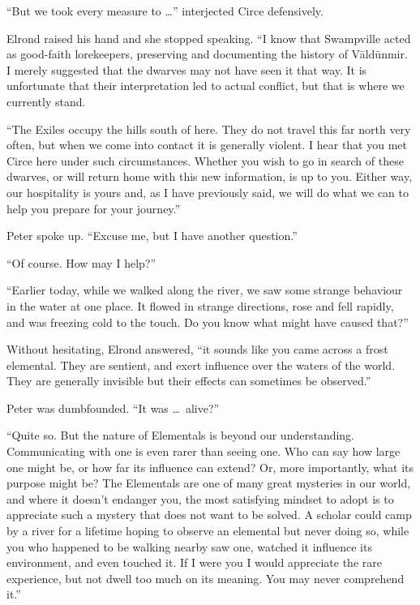 ``But we took every measure to \ldots'' interjected Circe defensively.

Elrond raised his hand and she stopped speaking.  ``I know that Swampville acted as good-faith lorekeepers, preserving and documenting the history of V\=ald\=unmir.  I merely suggested that the dwarves may not have seen it that way.  It is unfortunate that their interpretation led to actual conflict, but that is where we currently stand.

``The Exiles occupy the hills south of here.  They do not travel this far north very often, but when we come into contact it is generally violent.  I hear that you met Circe here under such circumstances.  Whether you wish to go in search of these dwarves, or will return home with this new information, is up to you.  Either way, our hospitality is yours and, as I have previously said, we will do what we can to help you prepare for your journey.''

Peter spoke up.  ``Excuse me, but I have another question.''

``Of course.  How may I help?''

``Earlier today, while we walked along the river, we saw some strange behaviour in the water at one place.  It flowed in strange directions, rose and fell rapidly, and was freezing cold to the touch.  Do you know what might have caused that?''

Without hesitating, Elrond answered, ``it sounds like you came across a frost elemental.  They are sentient, and exert influence over the waters of the world.  They are generally invisible but their effects can sometimes be observed.''

Peter was dumbfounded.  ``It was \ldots\ alive?''

``Quite so.  But the nature of Elementals is beyond our understanding.  Communicating with one is even rarer than seeing one.  Who can say how large one might be, or how far its influence can extend?  Or, more importantly, what its purpose might be?  The Elementals are one of many great mysteries in our world, and where it doesn't endanger you, the most satisfying mindset to adopt is to appreciate such a mystery that does not want to be solved.  A scholar could camp by a river for a lifetime hoping to observe an elemental but never doing so, while you who happened to be walking nearby saw one, watched it influence its environment, and even touched it.  If I were you I would appreciate the rare experience, but not dwell too much on its meaning.  You may never comprehend it.''

